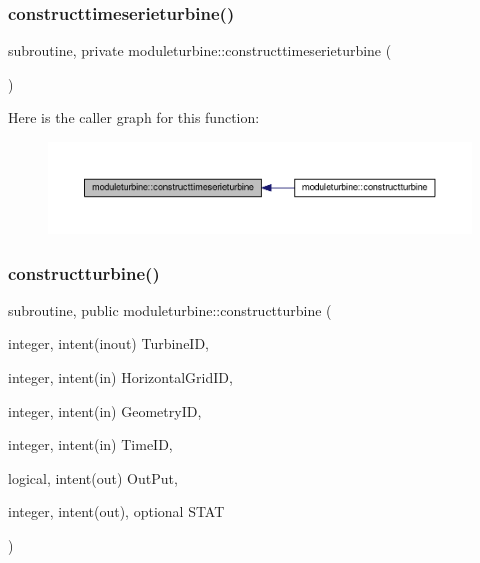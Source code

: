 \subsubsection{\texorpdfstring{constructtimeserieturbine()}{constructtimeserieturbine()}}
{\footnotesize\ttfamily subroutine, private moduleturbine\+::constructtimeserieturbine (\begin{DoxyParamCaption}{ }\end{DoxyParamCaption})\hspace{0.3cm}{\ttfamily [private]}}

Here is the caller graph for this function\+:\nopagebreak
\begin{figure}[H]
\begin{center}
\leavevmode
\includegraphics[width=350pt]{namespacemoduleturbine_a9771605ad11401e5f01589b0db35b8f2_icgraph}
\end{center}
\end{figure}
\mbox{\label{namespacemoduleturbine_aa2c0679550365b9b4e3258a1d4a155cf}} 
\subsubsection{\texorpdfstring{constructturbine()}{constructturbine()}}
{\footnotesize\ttfamily subroutine, public moduleturbine\+::constructturbine (\begin{DoxyParamCaption}\item[{integer, intent(inout)}]{Turbine\+ID,  }\item[{integer, intent(in)}]{Horizontal\+Grid\+ID,  }\item[{integer, intent(in)}]{Geometry\+ID,  }\item[{integer, intent(in)}]{Time\+ID,  }\item[{logical, intent(out)}]{Out\+Put,  }\item[{integer, intent(out), optional}]{S\+T\+AT }\end{DoxyParamCaption})}

